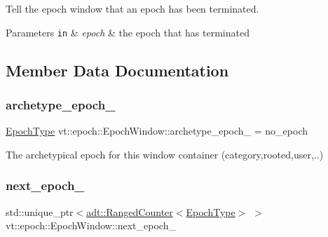 Tell the epoch window that an epoch has been terminated. 


\begin{DoxyParams}[1]{Parameters}
\mbox{\tt in}  & {\em epoch} & the epoch that has terminated \\
\hline
\end{DoxyParams}


\subsection{Member Data Documentation}
\mbox{\label{structvt_1_1epoch_1_1_epoch_window_a74c5c529d1a7fddf5f2d7a5cb9dbe4af}} 
\subsubsection{\texorpdfstring{archetype\+\_\+epoch\+\_\+}{archetype\_epoch\_}}
{\footnotesize\ttfamily \hyperlink{namespacevt_a985a5adf291c34a3ca263b3378388236}{Epoch\+Type} vt\+::epoch\+::\+Epoch\+Window\+::archetype\+\_\+epoch\+\_\+ = no\+\_\+epoch\hspace{0.3cm}{\ttfamily [private]}}



The archetypical epoch for this window container (category,rooted,user,..) 

\mbox{\label{structvt_1_1epoch_1_1_epoch_window_a946a18f109dcae51f347d02c6a700c4e}} 
\subsubsection{\texorpdfstring{next\+\_\+epoch\+\_\+}{next\_epoch\_}}
{\footnotesize\ttfamily std\+::unique\+\_\+ptr$<$\hyperlink{namespacevt_1_1adt_a075b41b03183cb280d453f44d5397637}{adt\+::\+Ranged\+Counter}$<$\hyperlink{namespacevt_a985a5adf291c34a3ca263b3378388236}{Epoch\+Type}$>$ $>$ vt\+::epoch\+::\+Epoch\+Window\+::next\+\_\+epoch\+\_\+\hspace{0.3cm}{\ttfamily [private]}}

